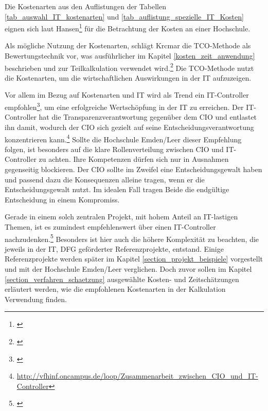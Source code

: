 Die Kostenarten aus den Auflistungen der Tabellen \ref{tab_auswahl_IT_kostenarten} und \ref{tab_auflistung_spezielle_IT_Kosten} eignen sich laut Hansen\footnote{\autocite[493-498]{hansen_business_2009}} für die Betrachtung der Kosten an einer Hochschule.

Als mögliche Nutzung der Kostenarten, schlägt Krcmar die TCO-Methode als Bewertungstechnik vor, was ausführlicher im Kapitel \ref{kosten_zeit_anwendung} beschrieben und zur Teilkalkulation verwendet wird.\footnote{\autocite[144]{krcmar_einfuhrung_2015}} Die TCO-Methode nutzt die Kostenarten, um die wirtschaftlichen Auswirkungen in der IT aufzuzeigen.

\clearpage

Vor allem im Bezug auf Kostenarten und IT wird als Trend ein IT-Controller empfohlen\footnote{\autocite[49]{gadatsch_masterkurs_2014}}, um eine erfolgreiche Wertschöpfung in der IT zu erreichen. Der IT-Controller hat die Transparenzverantwortung gegenüber dem CIO und entlastet ihn damit, wodurch der CIO sich gezielt auf seine Entscheidungsverantwortung konzentrieren kann.\footnote{\url{http://vfhinf.oncampus.de/loop/Zusammenarbeit_zwischen_CIO_und_IT-Controller}} Sollte die Hochschule Emden/Leer dieser Empfehlung folgen, ist besonders auf die klare Rollenverteilung zwischen CIO und IT-Controller zu achten. Ihre Kompetenzen dürfen sich nur in Ausnahmen gegenseitig blockieren. Der CIO sollte im Zweifel eine Entscheidungsgewalt haben und passend dazu die Konsequenzen alleine tragen, wenn er die Entscheidungsgewalt nutzt. Im idealen Fall tragen Beide die endgültige Entscheidung in einem Kompromiss.

Gerade in einem solch zentralen Projekt, mit hohem Anteil an IT-lastigen Themen, ist es zumindest empfehlenswert über einen IT-Controller nachzudenken.\footnote{\autocite[11-15]{stratmann_it_2013}} Besonders ist hier auch die höhere Komplexität zu beachten, die jeweils in der IT, DFG geförderter Referenzprojekte, entstand. Einige Referenzprojekte werden später im Kapitel \ref{section_projekt_beispiele} vorgestellt und mit der Hochschule Emden/Leer verglichen. Doch zuvor sollen im Kapitel \ref{section_verfahren_schaetzung} ausgewählte Kosten- und Zeitschätzungen erläutert werden, wie die empfohlenen Kostenarten in der Kalkulation Verwendung finden.

